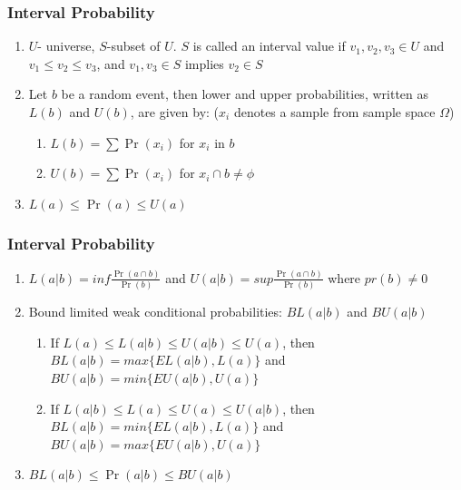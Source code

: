 \documentclass{beamer}
\providecommand{\pr}[1]{\ensuremath{\Pr\left(#1\right)}}
\begin{document}
\begin{frame}
    \frametitle{Interval Probability}
    \begin{enumerate}
        \item $U$- universe, $S$-subset of $U$. $S$ is called an interval value if $v_1,v_2,v_3 \in U$ and $v_1 \leq v_2 \leq v_3$, and $v_1, v_3 \in S$ implies $v_2 \in S$ 
        \newline
        \item Let $b$ be a random event, then \alert{lower and upper probabilities}, written as \alert{$L(b)$ and $U(b)$}, are given by: ($x_i$ denotes a sample from sample space $\Omega$)
        \begin{enumerate}
            \item $L(b) = \sum \pr{x_i}$ for $x_i$ in $b$
 
            \item $U(b) = \sum \pr{x_i}$ for $x_i \cap b \neq \phi$
            \newline
        \end{enumerate}
        
        \item $L(a) \leq \pr{a} \leq U(a)$
    
    \end{enumerate}
\end{frame}

\begin{frame}
    \frametitle{Interval Probability}
    \begin{enumerate}
          \item $L(a|b) = inf \frac{\pr{a \cap b}}{\pr{b}}$ and $U(a|b) = sup \frac{\pr{a \cap b}}{\pr{b}}$ where $pr(b) \neq 0$
          \newline
          \item Bound limited weak conditional probabilities: $BL(a|b)$ and $BU(a|b)$
    
          \begin{enumerate}
              \item  If $ L(a) \leq L(a|b) \leq U(a|b) \leq U(a)$, then
$BL(a|b)=max\{EL(a|b), L(a)\}$ and $BU(a|b)=min\{EU(a|b),
U(a)\}$
\newline
\item If $ L(a|b) \leq L(a) \leq U(a) \leq U(a|b)$, then
$BL(a|b)=min\{EL(a|b), L(a)\}$ and $BU(a|b)=max\{EU(a|b),
U(a)\}$
\newline
          \end{enumerate}
  \newline
          \item $BL(a|b) \leq \pr{a|b} \leq BU(a|b)$
    \end{enumerate}
\end{frame}
\end{document}

